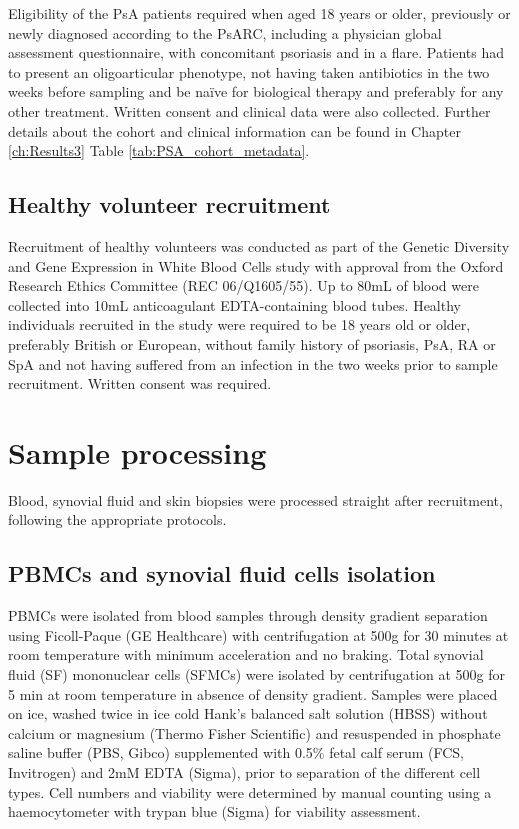 Eligibility of the PsA patients required when aged 18 years or older, previously or newly diagnosed according to the PsARC, including a physician global assessment questionnaire, with concomitant psoriasis and in a flare. Patients had to present an oligoarticular phenotype, not having taken antibiotics in the two weeks before sampling and be na\"{i}ve for biological therapy and preferably for any other treatment. Written consent and clinical data were also collected.
Further details about the cohort and clinical information can be found in Chapter \ref{ch:Results3} Table \ref{tab:PSA_cohort_metadata}.

\subsection{Healthy volunteer recruitment}
Recruitment of healthy volunteers was conducted as part of the Genetic Diversity and Gene Expression in White Blood Cells study with approval from the Oxford Research Ethics Committee (REC 06/Q1605/55). Up to 80mL of blood were collected into 10mL anticoagulant EDTA-containing blood tubes. Healthy individuals recruited in the study were required to be 18 years old or older, preferably British or European, without family history of psoriasis, PsA, RA or SpA and not having suffered from an infection in the two weeks prior to sample recruitment. Written consent was required.



\section{Sample processing}
\label{sample_processing}
Blood, synovial fluid and skin biopsies were processed straight after recruitment, following the appropriate protocols.

\subsection{PBMCs and synovial fluid cells isolation}
PBMCs were isolated from blood samples through density gradient separation using Ficoll-Paque (GE Healthcare) with centrifugation at 500g for 30 minutes at room temperature with minimum acceleration and no braking. Total synovial fluid (SF) mononuclear cells (SFMCs) were isolated by centrifugation at 500g for 5 min at room temperature in absence of density gradient. Samples were placed on ice, washed twice in ice cold Hank’s balanced salt solution (HBSS) without calcium or magnesium (Thermo Fisher Scientific) and resuspended in phosphate saline buffer (PBS, Gibco) supplemented with 0.5\% fetal calf serum (FCS, Invitrogen) and 2mM EDTA (Sigma), prior to separation of the different cell types. Cell numbers and viability were determined by manual counting using a haemocytometer with trypan blue (Sigma) for viability assessment.


